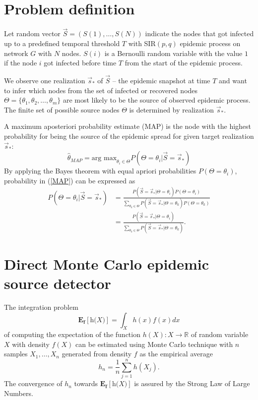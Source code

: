 \documentclass[times, utf8, diplomski]{fer}
\begin{document}
\section{Problem definition}
Let random vector $\vec S = (S(1), \ldots, S(N))$ indicate the nodes that got infected up to a predefined temporal threshold $T$ with SIR$(p, q)$ epidemic process on network $G$ with $N$ nodes. $S(i)$ is a Bernoulli random variable with the value $1$ if the node $i$ got infected before time $T$ from the start of the epidemic process. 

We observe one realization $\vec s_*$ of $\vec S$ -- the epidemic snapshot at time $T$ and want to infer which nodes from the set of infected or recovered nodes $\Theta = \{\theta_1, \theta_2, \ldots, \theta_m \}$ are most likely to be the source of observed epidemic process.  
 The finite set of possible source nodes $\Theta$ is determined by realization $\vec s_*$.

A maximum aposteriori probability estimate (MAP) is the node with the highest probability for being the source of the epidemic spread for  given target realization $\vec s_*$: 
\begin{equation}
\hat{\theta}_{MAP} = \text{arg max}_{\theta_i \in \Theta} P(\Theta = \theta_i | \vec{S} = \vec s_*)
\label{MAP}
\end{equation}
By applying the Bayes theorem with equal apriori probabilities $P(\Theta = \theta_i)$, probability in (\ref{MAP}) can be expressed as 
\begin{equation}
\begin{aligned}
P(\Theta = \theta_i | \vec{S} = \vec s_*) &= \frac{P(\vec S = \vec s_* | \Theta = \theta_i) P(\Theta = \theta_i)}{\sum_{\theta_k \in \Theta} P(\vec S = \vec s_* | \Theta = \theta_k) P(\Theta = \theta_k)} \\ &= \frac{P(\vec S = \vec s_* | \Theta = \theta_i)}{\sum_{\theta_k \in \Theta} P(\vec S = \vec s_* | \Theta = \theta_k)}.
\end{aligned}
\label{MAP_pravi}
\end{equation}

\section{Direct Monte Carlo epidemic source detector}

The integration problem
\begin{equation}
\mathbf{E_f[\textit{h(X)}]} = \int_{X} h(x) f(x) dx
\label{exp}
\end{equation} of computing the expectation of the function $h(X) : X \rightarrow \mathbb{R}$ of random variable $X$ with density $f(X)$ can be estimated using Monte Carlo technique with $n$ samples $X_1, \ldots, X_n$ generated from density $f$ as the empirical average 
\begin{equation}
h_n = \frac{1}{n} \sum_{j = 1}^{n} h(X_j).
\end{equation}
The convergence of $h_n$ towards $\mathbf{E_f[\textit{h(X)}]}$ is assured by the Strong Law of Large Numbers.
\end{document}
